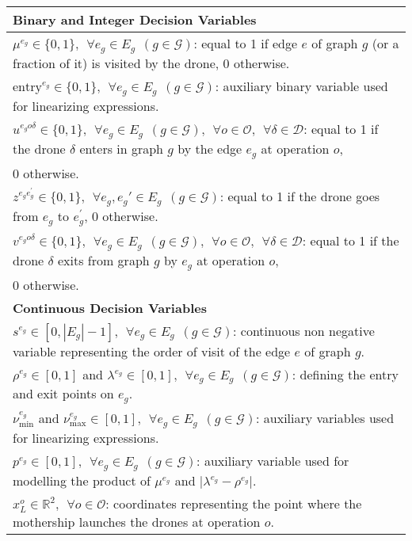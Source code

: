 \begin{table}[h!]
\scriptsize
\centering
\begin{tabular}{|l|}
\hline 
\textbf{Binary and Integer Decision Variables}\\
\hline
$\mu^{e_g} \in \{0,1\}, \:\: \forall e_g \in E_g\:\: (g \in \mathcal{G})$: equal to 1 if edge $e$ of graph $g$ (or a fraction of it) is visited by the drone, 0 otherwise.\\
$\text{entry}^{e_g} \in \{0,1\}, \:\: \forall e_g \in E_g\:\: (g \in \mathcal{G})$: auxiliary binary variable used for linearizing expressions.\\
$u^{e_{g}o\delta} \in \{0,1\}, \:\: \forall e_g \in E_g\:\: (g \in \mathcal{G}), \:\:\forall o \in \mathcal O, \:\: \forall \delta \in \mathcal D$: equal to 1 if the drone $\delta$ enters in graph $g$ by the edge $e_g$ at operation $o$,\\ \hspace*{1cm} 0 otherwise.\\
$z^{e_{g}e^{'}_{g}} \in \{0,1\}, \:\: \forall e_g, e_g' \in E_g\:\: (g \in \mathcal{G})$: equal to 1 if the drone goes from $e_g$ to $e^{'}_{g}$, 0 otherwise.\\
$v^{e_{g}o\delta} \in \{0,1\}, \:\: \forall e_g \in E_g\:\: (g \in \mathcal{G}), \:\: \forall o \in \mathcal O, \:\: \forall \delta \in \mathcal D$: equal to 1 if the drone $\delta$ exits from graph $g$ by $e_g$ at operation $o$,\\ \hspace*{1cm} 0 otherwise.\\
\hline
\textbf{Continuous Decision Variables}\\
\hline
$s^{e_g}\in[0, |E_g|-1],\:\: \forall e_g \in E_g\:\: (g \in \mathcal{G})$: continuous non negative variable representing the order of visit of the edge $e$ of graph $g$.\\
$\rho^{e_g} \in [0,1]$ and $\lambda^{e_g} \in [0,1], \:\: \forall e_g \in E_g\:\: (g \in \mathcal{G})$: defining the entry and exit points on $e_g$.\\
$\nu_\text{min}^{e_g}$ and $\nu_\text{max}^{e_g} \in [0,1], \:\: \forall e_g \in E_g\:\: (g \in \mathcal{G})$: auxiliary variables used for linearizing expressions.\\
$p^{e_g}\in [0, 1], \:\: \forall e_g \in E_g\:\: (g \in \mathcal G)$: auxiliary variable used for modelling the product of $\mu^{e_g}$ and $|\lambda^{e_g}-\rho^{e_g}|$.\\
$x_L^o\in\mathbb R^2, \:\: \forall o \in \mathcal O$: coordinates representing the point where the mothership launches the drones at operation $o$.\\

\end{tabular}
\end{table}
